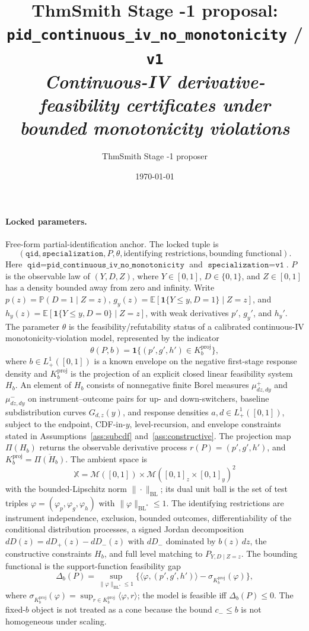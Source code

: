 \documentclass[11pt]{article}
\title{ThmSmith Stage -1 proposal: \texttt{pid\_continuous\_iv\_no\_monotonicity} / \texttt{v1}%
  \\ \large\textit{Continuous-IV derivative-feasibility certificates under bounded monotonicity violations}}
\author{ThmSmith Stage -1 proposer}
\date{\today}
\newcommand{\E}{\mathbb{E}}
\renewcommand{\Pr}{\mathbb{P}}
\newcommand{\one}{\mathbf{1}}
\theoremstyle{definition}
\theoremstyle{plain}
\theoremstyle{remark}
\begin{document}
\maketitle


\paragraph{Locked parameters.}
Free-form partial-identification anchor.  The locked tuple is
\[
(\texttt{qid},\texttt{specialization},P,\theta,\text{identifying restrictions},\text{bounding functional}).
\]
Here \(\texttt{qid}=\texttt{pid\_continuous\_iv\_no\_monotonicity}\) and \(\texttt{specialization}=\texttt{v1}\).  \(P\) is the observable law of \((Y,D,Z)\), where \(Y\in[0,1]\), \(D\in\{0,1\}\), and \(Z\in[0,1]\) has a density bounded away from zero and infinity.  Write \(p(z)=\Pr(D=1\mid Z=z)\), \(g_y(z)=\E[\one\{Y\le y,D=1\}\mid Z=z]\), and \(h_y(z)=\E[\one\{Y\le y,D=0\}\mid Z=z]\), with weak derivatives \(p'\), \(g_y'\), and \(h_y'\).  The parameter \(\theta\) is the feasibility/refutability status of a calibrated continuous-IV monotonicity-violation model, represented by the indicator
\[
\theta(P,b)=\one\{(p',g',h')\in K_b^{\mathrm{proj}}\},
\]
where \(b\in L^1_+([0,1])\) is a known envelope on the negative first-stage response density and \(K_b^{\mathrm{proj}}\) is the projection of an explicit closed linear feasibility system \(H_b\).  An element of \(H_b\) consists of nonnegative finite Borel measures \(\mu^+_{dz,dy}\) and \(\mu^-_{dz,dy}\) on instrument--outcome pairs for up- and down-switchers, baseline subdistribution curves \(G_{d,z}(y)\), and response densities \(a,d\in L^1_+([0,1])\), subject to the endpoint, CDF-in-\(y\), level-recursion, and envelope constraints stated in Assumptions~\ref{ass:subcdf} and~\ref{ass:constructive}.  The projection map \(\Pi(H_b)\) returns the observable derivative process \(r(P)=(p',g',h')\), and \(K_b^{\mathrm{proj}}=\overline{\Pi(H_b)}\).  The ambient space is
\[
\mathbb X=\mathcal M([0,1])\times \mathcal M([0,1]_z\times[0,1]_y)^2
\]
with the bounded-Lipschitz norm \(\|\cdot\|_{\mathrm{BL}}\); its dual unit ball is the set of test triples \(\varphi=(\varphi_p,\varphi_g,\varphi_h)\) with \(\|\varphi\|_{\mathrm{BL}^\ast}\le1\).  The identifying restrictions are instrument independence, exclusion, bounded outcomes, differentiability of the conditional distribution processes, a signed Jordan decomposition \(dD(z)=dD_+(z)-dD_-(z)\) with \(dD_-\) dominated by \(b(z)\,dz\), the constructive constraints \(H_b\), and full level matching to \(P_{Y,D\mid Z=z}\).  The bounding functional is the support-function feasibility gap
\[
\Delta_b(P)=\sup_{\|\varphi\|_{\mathrm{BL}^\ast}\le1}\{\langle\varphi,(p',g',h')\rangle-\sigma_{K_b^{\mathrm{proj}}}(\varphi)\},
\]
where \(\sigma_{K_b^{\mathrm{proj}}}(\varphi)=\sup_{r\in K_b^{\mathrm{proj}}}\langle\varphi,r\rangle\); the model is feasible iff \(\Delta_b(P)\le0\).  The fixed-\(b\) object is not treated as a cone because the bound \(c_-\le b\) is not homogeneous under scaling.
\end{document}
